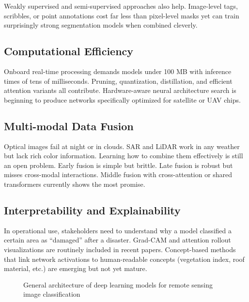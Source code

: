 \documentclass[12pt,a4paper]{article}
\begin{document}
Weakly supervised and semi-supervised approaches also help. Image-level tags, scribbles, or point annotations cost far less than pixel-level masks yet can train surprisingly strong segmentation models when combined cleverly.

\subsection{Computational Efficiency}

Onboard real-time processing demands models under 100 MB with inference times of tens of milliseconds. Pruning, quantization, distillation, and efficient attention variants all contribute. Hardware-aware neural architecture search is beginning to produce networks specifically optimized for satellite or UAV chips.

\subsection{Multi-modal Data Fusion}

Optical images fail at night or in clouds. SAR and LiDAR work in any weather but lack rich color information. Learning how to combine them effectively is still an open problem. Early fusion is simple but brittle. Late fusion is robust but misses cross-modal interactions. Middle fusion with cross-attention or shared transformers currently shows the most promise.

\subsection{Interpretability and Explainability}

In operational use, stakeholders need to understand why a model classified a certain area as “damaged” after a disaster. Grad-CAM and attention rollout visualizations are routinely included in recent papers. Concept-based methods that link network activations to human-readable concepts (vegetation index, roof material, etc.) are emerging but not yet mature.

\begin{figure}[htbp]
\centering
{}
\caption{General architecture of deep learning models for remote sensing image classification}
\label{fig:architecture}
\end{figure}
\end{document}
